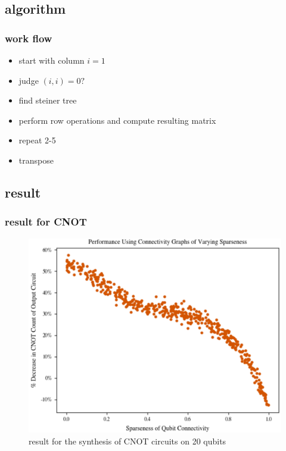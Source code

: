 \subsection{algorithm}
\begin{frame}
    \frametitle{work flow}
    \begin{itemize}
        \item start with column $i=1$
        \item judge $(i,i)=0?$
        \item find steiner tree
        \item perform row operations and compute resulting matrix
        \item repeat 2-5
        \item transpose
    \end{itemize}
\end{frame}

\subsection{result}
\begin{frame}
    \frametitle{result for CNOT}
    \begin{figure}
        \centering
        \includegraphics[width=.6\linewidth]{figure/CNOT-result.png}
        \caption{result for the synthesis of CNOT circuits on 20 qubits}
    \end{figure}
\end{frame}